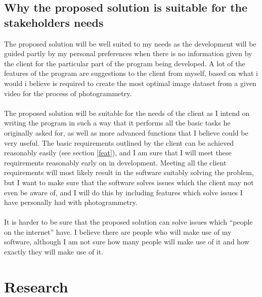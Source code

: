 \documentclass[11pt]{report}
\begin{document}
\subsection{Why the proposed solution is suitable for the stakeholders needs}
The proposed solution will be well suited to my needs as the development will be guided partly by my personal preferences when there is no information given by the client for the particular part of the program being developed.
A lot of the features of the program are suggestions to the client from myself, based on what i would i believe is required to create the most optimal image dataset from a given video for the process of photogrammetry.\\\\
The proposed solution will be suitable for the needs of the client as I intend on writing the program in such a way that it performs all the basic tasks he originally asked for, as well as more advanced functions that I believe could be very useful. The basic requirements outlined by the client can be achieved reasonably easily (see section \ref{feat}), and I am sure that I will meet these requirements reasonably early on in development. Meeting all the client requirements will most likely result in the software suitably solving the problem, but I want to make sure that the software solves issues which the client may not even be aware of, and I will do this by including features which solve issues I have personally had with photogrammetry.\\\\
It is harder to be sure that the proposed solution can solve issues which ``people on the internet'' have. I believe there are people who will make use of my software, although I am not sure how many people will make use of it and how exactly they will make use of it.

\section{Research} \label{research}
\end{document}
